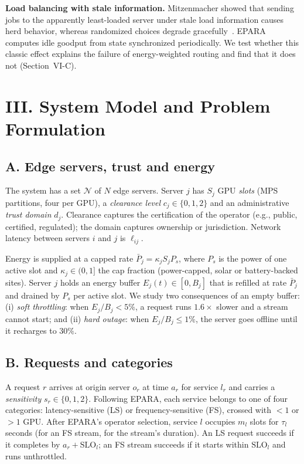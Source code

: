 \documentclass{article}
\begin{document}
\textbf{Load balancing with stale information.}
Mitzenmacher showed that sending jobs to the apparently least-loaded server under stale load information causes herd behavior, whereas randomized choices degrade gracefully~\cite{mitzenmacher2000old,mitzenmacher2001two}. EPARA computes idle goodput from state synchronized periodically. We test whether this classic effect explains the failure of energy-weighted routing and find that it does not (Section~VI-C).

\section*{III. System Model and Problem Formulation}

\subsection*{A. Edge servers, trust and energy}
The system has a set $\mathcal{N}$ of $N$ edge servers. Server $j$ has $S_j$ GPU \emph{slots} (MPS partitions, four per GPU), a \emph{clearance level} $c_j\in\{0,1,2\}$ and an administrative \emph{trust domain} $d_j$. Clearance captures the certification of the operator (e.g., public, certified, regulated); the domain captures ownership or jurisdiction. Network latency between servers $i$ and $j$ is $\ell_{ij}$.

Energy is supplied at a capped rate $\bar P_j=\kappa_j S_j P_s$, where $P_s$ is the power of one active slot and $\kappa_j\in(0,1]$ the cap fraction (power-capped, solar or battery-backed sites). Server $j$ holds an energy buffer $E_j(t)\in[0,B_j]$ that is refilled at rate $\bar P_j$ and drained by $P_s$ per active slot. We study two consequences of an empty buffer:
(i) \emph{soft throttling}: when $E_j/B_j<5\%$, a request runs $1.6\times$ slower and a stream cannot start; and
(ii) \emph{hard outage}: when $E_j/B_j\le1\%$, the server goes offline until it recharges to $30\%$.

\subsection*{B. Requests and categories}
A request $r$ arrives at origin server $o_r$ at time $a_r$ for service $l_r$ and carries a \emph{sensitivity} $s_r\in\{0,1,2\}$. Following EPARA, each service belongs to one of four categories: latency-sensitive (LS) or frequency-sensitive (FS), crossed with $<1$ or $>1$ GPU. After EPARA's operator selection, service $l$ occupies $m_l$ slots for $\tau_l$ seconds (for an FS stream, for the stream's duration). An LS request succeeds if it completes by $a_r+\mathrm{SLO}_l$; an FS stream succeeds if it starts within $\mathrm{SLO}_l$ and runs unthrottled.
\end{document}
